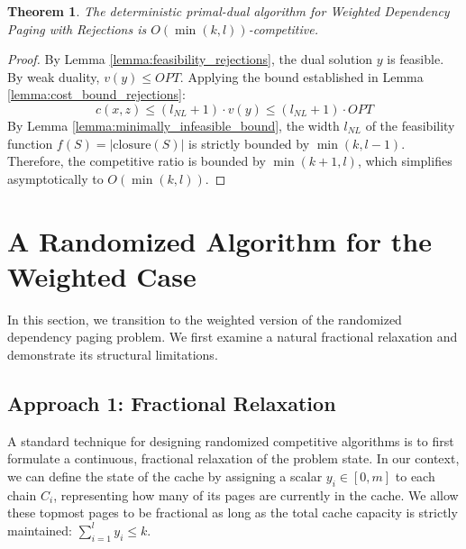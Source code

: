 \documentclass[a4paper]{article}
\newtheorem{theorem}{Theorem}    %
\begin{document}
\begin{theorem}
\label{thm:deterministic_rejections_final}
The deterministic primal-dual algorithm for Weighted Dependency Paging with Rejections is $O(\min(k,l))$-competitive.
\end{theorem}
\begin{proof}
By Lemma \ref{lemma:feasibility_rejections}, the dual solution $y$ is feasible. By weak duality, $v(y) \le OPT$. Applying the bound established in Lemma \ref{lemma:cost_bound_rejections}:
\[
c(x,z) \le (l_{NL} + 1) \cdot v(y) \le (l_{NL} + 1) \cdot OPT
\]
By Lemma \ref{lemma:minimally_infeasible_bound}, the width $l_{NL}$ of the feasibility function $f(S) = |\text{closure}(S)|$ is strictly bounded by $\min(k, l-1)$. Therefore, the competitive ratio is bounded by $\min(k+1, l)$, which simplifies asymptotically to $O(\min(k, l))$.
\end{proof}

\section{A Randomized Algorithm for the Weighted Case}

In this section, we transition to the weighted version of the randomized dependency paging problem. We first examine a natural fractional relaxation and demonstrate its structural limitations.

\subsection{Approach 1: Fractional Relaxation}

A standard technique for designing randomized competitive algorithms is to first formulate a continuous, fractional relaxation of the problem state. In our context, we can define the state of the cache by assigning a scalar $y_i \in [0, m]$ to each chain $C_i$, representing how many of its pages are currently in the cache. We allow these topmost pages to be fractional as long as the total cache capacity is strictly maintained: $\sum_{i=1}^l y_i \le k$.
\end{document}
